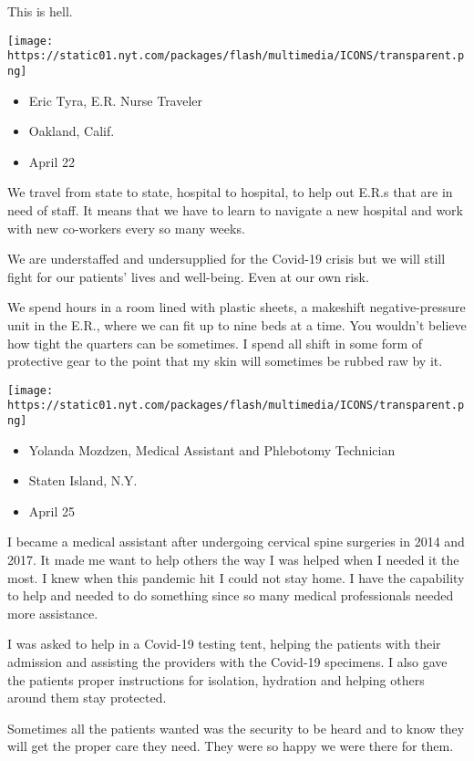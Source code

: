 This is hell.

\texttt{[image: https://static01.nyt.com/packages/flash/multimedia/ICONS/transparent.png]}

\begin{itemize}
\tightlist
\item
  Eric Tyra, E.R. Nurse Traveler
\item
  Oakland, Calif.
\item
  April 22
\end{itemize}

We travel from state to state, hospital to hospital, to help out E.R.s
that are in need of staff. It means that we have to learn to navigate a
new hospital and work with new co-workers every so many weeks.

We are understaffed and undersupplied for the Covid-19 crisis but we
will still fight for our patients' lives and well-being. Even at our own
risk.

We spend hours in a room lined with plastic sheets, a makeshift
negative-pressure unit in the E.R., where we can fit up to nine beds at
a time. You wouldn't believe how tight the quarters can be sometimes. I
spend all shift in some form of protective gear to the point that my
skin will sometimes be rubbed raw by it.

\texttt{[image: https://static01.nyt.com/packages/flash/multimedia/ICONS/transparent.png]}

\begin{itemize}
\tightlist
\item
  Yolanda Mozdzen, Medical Assistant and Phlebotomy Technician
\item
  Staten Island, N.Y.
\item
  April 25
\end{itemize}

I became a medical assistant after undergoing cervical spine surgeries
in 2014 and 2017. It made me want to help others the way I was helped
when I needed it the most. I knew when this pandemic hit I could not
stay home. I have the capability to help and needed to do something
since so many medical professionals needed more assistance.

I was asked to help in a Covid-19 testing tent, helping the patients
with their admission and assisting the providers with the Covid-19
specimens. I also gave the patients proper instructions for isolation,
hydration and helping others around them stay protected.

Sometimes all the patients wanted was the security to be heard and to
know they will get the proper care they need. They were so happy we were
there for them.

